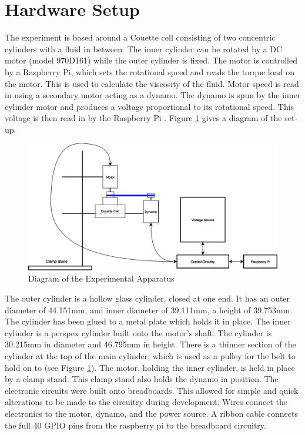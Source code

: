\documentclass[twoside,a4]{report}
\def\br{\newline \newline \noindent}
\def\rpi{Raspberry Pi }
\begin{document}
	\section{Hardware Setup} %
	The experiment is based around a Couette cell consisting of two concentric cylinders with a fluid in between. The inner cylinder can be rotated by a DC motor (model 970D161) while the outer cylinder is fixed. The motor is controlled by a Raspberry Pi, which sets the rotational speed and reads the torque load on the motor. This is used to calculate the viscosity of the fluid. Motor speed is read in using a secondary motor acting as a dynamo. The dynamo is spun by the inner cylinder motor and produces a voltage proportional to its rotational speed. This voltage is then read in by the \rpi.
	Figure \ref{expdia} gives a diagram of the set-up.\newline
	\begin{figure}[!htb]
		\centering
		\includegraphics[scale=0.3]{images/exp_set_up.png} %
		\caption{Diagram of the Experimental Apparatus}
		\label{expdia}
	\end{figure} \newline \noindent
	The outer cylinder is a hollow glass cylinder, closed at one end. It has an outer diameter of 44.151mm, and inner diameter of 39.111mm, a height of 39.753mm. The cylinder has been glued to a metal plate which holds it in place. \br
	The inner cylinder is a perspex cylinder built onto the motor's shaft. The cylinder is 30.215mm in diameter and 46.795mm in height. There is a thinner section of the cylinder at the top of the main cylinder, which is used as a pulley for the belt to hold on to (see Figure \ref{expdia}). \br
	The motor, holding the inner cylinder, is held in place by a clamp stand. This clamp stand also holds the dynamo in position.\br
	The electronic circuits were built onto breadboards. This allowed for simple and quick alterations to be made to the circuitry during development. Wires connect the electronics to the motor, dynamo, and the power source. A ribbon cable connects the full 40 GPIO pins from the raspberry pi to the breadboard circuitry.
	
\end{document}
